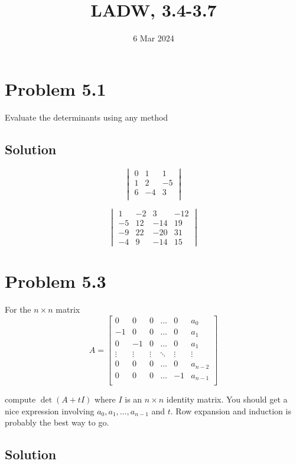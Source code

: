 \documentclass{article}
\title{LADW, 3.4-3.7}
\date{6 Mar 2024}
\begin{document}
\maketitle

\section*{Problem 5.1}
Evaluate the determinants using any method

\subsection*{Solution}
\[\begin{vmatrix}
    0 & 1 & 1\\
    1 & 2 & -5\\
    6 & -4 & 3\\
\end{vmatrix}\]

\vs

\[\begin{vmatrix}
    1 & -2 & 3 & -12\\
    -5 & 12 & -14 & 19\\
    -9 & 22 & -20 & 31\\
    -4 & 9 & -14 & 15
\end{vmatrix}\]

\section*{Problem 5.3}
For the $n\times n$ matrix
\[A=\begin{bmatrix}
    0 & 0 & 0 & \ldots & 0 & a_0\\
    -1 & 0 & 0 & \ldots & 0 & a_1\\
    0 & -1 & 0 & \ldots & 0 & a_1\\
    \vdots & \vdots & \vdots & \ddots & \vdots & \vdots\\
    0 & 0 & 0 & \ldots & 0 & a_{n-2}\\
    0 & 0 & 0 & \ldots & -1 & a_{n-1}\\
\end{bmatrix}\]

compute $\det(A+tI)$ where $I$ is an $n\times n$ identity matrix. You should get a nice expression involving $a_0, a_1, \ldots, a_{n-1}$ and $t$. Row expansion and induction is probably the best way to go.

\subsection*{Solution}
\end{document}
